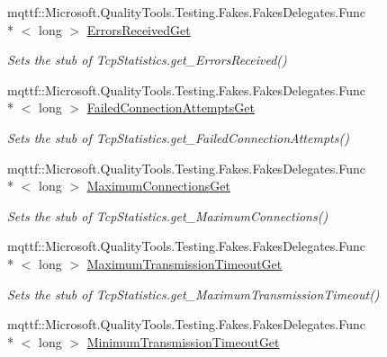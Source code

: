\begin{DoxyCompactItemize}
mqttf\-::\-Microsoft.\-Quality\-Tools.\-Testing.\-Fakes.\-Fakes\-Delegates.\-Func\\*
$<$ long $>$ \hyperlink{class_system_1_1_net_1_1_network_information_1_1_fakes_1_1_stub_tcp_statistics_a8b5adf73ec169213925e6c7adbca2d8e}{Errors\-Received\-Get}
\begin{DoxyCompactList}\small\item\em Sets the stub of Tcp\-Statistics.\-get\-\_\-\-Errors\-Received()\end{DoxyCompactList}\item 
mqttf\-::\-Microsoft.\-Quality\-Tools.\-Testing.\-Fakes.\-Fakes\-Delegates.\-Func\\*
$<$ long $>$ \hyperlink{class_system_1_1_net_1_1_network_information_1_1_fakes_1_1_stub_tcp_statistics_ab3089660042d4c7191824c16d332f91f}{Failed\-Connection\-Attempts\-Get}
\begin{DoxyCompactList}\small\item\em Sets the stub of Tcp\-Statistics.\-get\-\_\-\-Failed\-Connection\-Attempts()\end{DoxyCompactList}\item 
mqttf\-::\-Microsoft.\-Quality\-Tools.\-Testing.\-Fakes.\-Fakes\-Delegates.\-Func\\*
$<$ long $>$ \hyperlink{class_system_1_1_net_1_1_network_information_1_1_fakes_1_1_stub_tcp_statistics_abc1808480a923ed892ee3597485f34d5}{Maximum\-Connections\-Get}
\begin{DoxyCompactList}\small\item\em Sets the stub of Tcp\-Statistics.\-get\-\_\-\-Maximum\-Connections()\end{DoxyCompactList}\item 
mqttf\-::\-Microsoft.\-Quality\-Tools.\-Testing.\-Fakes.\-Fakes\-Delegates.\-Func\\*
$<$ long $>$ \hyperlink{class_system_1_1_net_1_1_network_information_1_1_fakes_1_1_stub_tcp_statistics_a6ee353e20db70c112f7350f9165e19a2}{Maximum\-Transmission\-Timeout\-Get}
\begin{DoxyCompactList}\small\item\em Sets the stub of Tcp\-Statistics.\-get\-\_\-\-Maximum\-Transmission\-Timeout()\end{DoxyCompactList}\item 
mqttf\-::\-Microsoft.\-Quality\-Tools.\-Testing.\-Fakes.\-Fakes\-Delegates.\-Func\\*
$<$ long $>$ \hyperlink{class_system_1_1_net_1_1_network_information_1_1_fakes_1_1_stub_tcp_statistics_aacf0cbcb11a3c3c6e4658414387459bd}{Minimum\-Transmission\-Timeout\-Get}

\end{DoxyCompactItemize}
